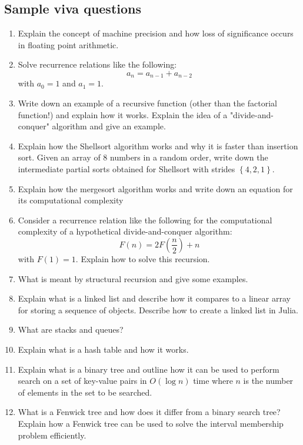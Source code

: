 \documentclass[11pt]{article}
\begin{document}
\begin{multicols}{2}
\section*{Sample viva questions}
\begin{enumerate}
\item Explain the concept of machine precision and how loss of significance occurs in floating point arithmetic.
\item
Solve recurrence relations like the following:
\begin{displaymath}
a_n = a_{n-1} + a_{n-2}
\end{displaymath}
with $a_0=1$ and $a_1=1$.
\item
Write down an example of a recursive function (other than the factorial function!) and explain how it works. Explain the idea of a "divide-and-conquer" algorithm and give an example.
\item
Explain how the Shellsort algorithm works and why it is faster than insertion sort. Given an array of 8 numbers in a random order, write down the intermediate partial sorts obtained for Shellsort with strides $\left\{4, 2, 1\right\}$. 
\item
Explain how the mergesort algorithm works and write down an equation for its computational complexity
\item
Consider a recurrence relation like the following for the computational complexity of a hypothetical divide-and-conquer algorithm:
\begin{displaymath}
F(n) = 2 F\left(\frac{n}{2}\right) +n
\end{displaymath}
with $F(1)=1$. Explain how to solve this recursion.
\item
What is meant by structural recursion and give some examples.
\item
Explain what is a linked list and describe how it compares to a linear array for storing a sequence of objects. Describe how to create a linked list in Julia.
\item What are stacks  and queues?
\item Explain what is a hash table and how it works.
\item
Explain what is a binary tree and outline how it can be used to perform search on a set of key-value pairs in $O(\log n)$ time where $n$ is the number of elements in the set to be searched.
\item
What is a Fenwick tree and how does it differ from a binary search tree? Explain how a Fenwick tree can be used to solve the interval membership problem efficiently. 

\end{enumerate}
\end{multicols}
\end{document}
